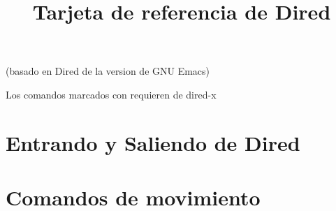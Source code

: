 

\title{Tarjeta de referencia de Dired}

\centerline{(basado en Dired de la version \versionemacs{} de GNU Emacs)}
\centerline{Los comandos marcados con \dx{} requieren de dired-x}






\section{Entrando y Saliendo de Dired}


\section{Comandos de movimiento}

